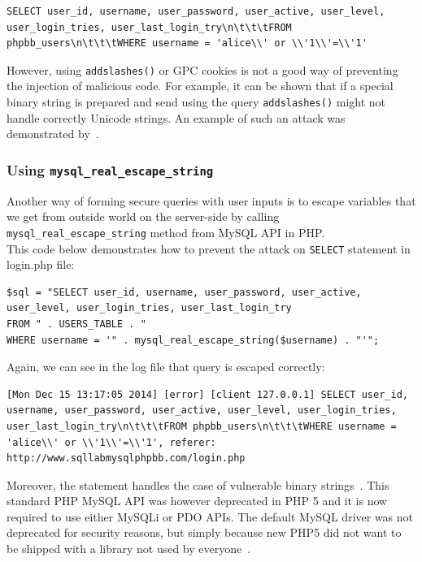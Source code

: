 \documentclass[12pt, a4paper]{article}
\begin{document}
\lstset{
	captionpos=b,
	frame=single,
	language=SQL,
	breaklines=true,
	label=sqladdslash1
}
\begin{lstlisting}
SELECT user_id, username, user_password, user_active, user_level, user_login_tries, user_last_login_try\n\t\t\tFROM phpbb_users\n\t\t\tWHERE username = 'alice\\' or \\'1\\'=\\'1'
\end{lstlisting}

However, using  \texttt{addslashes()} or GPC cookies is not a good way of preventing the injection of malicious code. For example, it can be shown that if a special binary string is prepared and send using the query \texttt{addslashes()} might not handle correctly Unicode strings. An example of such an attack was demonstrated by~\cite{shiflett06}.

\subsubsection{Using \texttt{mysql\_real\_escape\_string}}
Another way of forming secure queries with user inputs is to escape variables that we get from outside world on the server-side by calling \texttt{mysql\_real\_escape\_string} method from MySQL API in PHP.\\

This code below demonstrates how to prevent the attack on \texttt{SELECT} statement in login.php file:

\lstset{
	captionpos=b,
	frame=single,
	language=PHP,
	breaklines=true,
	label=sqladdslash2
}
\begin{lstlisting}
$sql = "SELECT user_id, username, user_password, user_active, user_level, user_login_tries, user_last_login_try
FROM " . USERS_TABLE . "
WHERE username = '" . mysql_real_escape_string($username) . "'";
\end{lstlisting}
Again, we can see in the log file that query is escaped correctly:
\lstset{
	captionpos=b,
	frame=single,
	language=SQL,
	breaklines=true,
	label=sqladdslash3
}
\begin{lstlisting}
[Mon Dec 15 13:17:05 2014] [error] [client 127.0.0.1] SELECT user_id, username, user_password, user_active, user_level, user_login_tries, user_last_login_try\n\t\t\tFROM phpbb_users\n\t\t\tWHERE username = 'alice\\' or \\'1\\'=\\'1', referer: http://www.sqllabmysqlphpbb.com/login.php
\end{lstlisting}
Moreover, the statement handles the case of vulnerable binary strings~\cite{shiflett06}. This standard PHP MySQL API was however deprecated in PHP 5 and it is now required to use either MySQLi or PDO APIs. The default MySQL driver was not deprecated for security reasons, but simply because new PHP5 did not want to be shipped with a library not used by everyone~\cite{phpfaq}.
\end{document}
